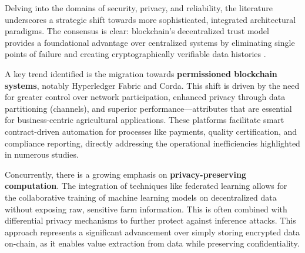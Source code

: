 \documentclass[12pt,onecolumn]{IEEEtran} %
\begin{document}
Delving into the domains of security, privacy, and reliability, the literature underscores a strategic shift towards more sophisticated, integrated architectural paradigms. The consensus is clear: blockchain's decentralized trust model provides a foundational advantage over centralized systems by eliminating single points of failure and creating cryptographically verifiable data histories \cite{aliyu2023blockchainbasedsmartfarm, soy2025blockchainintegrationin}.

A key trend identified is the migration towards \textbf{permissioned blockchain systems}, notably Hyperledger Fabric and Corda. This shift is driven by the need for greater control over network participation, enhanced privacy through data partitioning (channels), and superior performance—attributes that are essential for business-centric agricultural applications. These platforms facilitate smart contract-driven automation for processes like payments, quality certification, and compliance reporting, directly addressing the operational inefficiencies highlighted in numerous studies.

Concurrently, there is a growing emphasis on \textbf{privacy-preserving computation}. The integration of techniques like federated learning \cite{daund2025designofan} allows for the collaborative training of machine learning models on decentralized data without exposing raw, sensitive farm information. This is often combined with differential privacy mechanisms to further protect against inference attacks. This approach represents a significant advancement over simply storing encrypted data on-chain, as it enables value extraction from data while preserving confidentiality.
\end{document}
